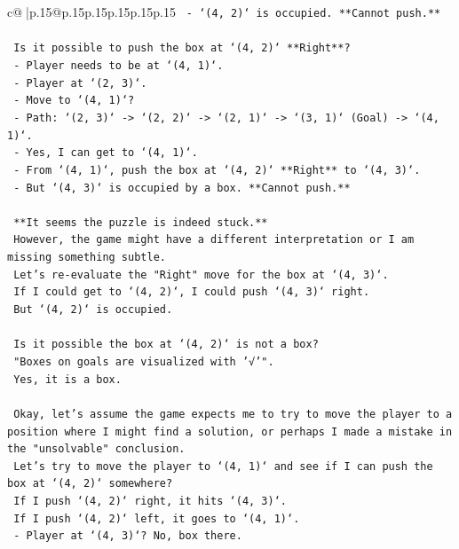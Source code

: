 \documentclass{article}
\begin{document}
{\begin{supertabular}{c@{$\;$}|p{.15\linewidth}@{}p{.15\linewidth}p{.15\linewidth}p{.15\linewidth}p{.15\linewidth}p{.15\linewidth}}
{{{\texttt{    {-} `(4, 2)` is occupied. **Cannot push.**} \\
\\ 
\texttt{    Is it possible to push the box at `(4, 2)` **Right**?} \\
\texttt{    {-} Player needs to be at `(4, 1)`.} \\
\texttt{    {-} Player at `(2, 3)`.} \\
\texttt{    {-} Move to `(4, 1)`?} \\
\texttt{    {-} Path: `(2, 3)` {-}> `(2, 2)` {-}> `(2, 1)` {-}> `(3, 1)` (Goal) {-}> `(4, 1)`.} \\
\texttt{    {-} Yes, I can get to `(4, 1)`.} \\
\texttt{    {-} From `(4, 1)`, push the box at `(4, 2)` **Right** to `(4, 3)`.} \\
\texttt{    {-} But `(4, 3)` is occupied by a box. **Cannot push.**} \\
\\ 
\texttt{    **It seems the puzzle is indeed stuck.**} \\
\texttt{    However, the game might have a different interpretation or I am missing something subtle.} \\
\texttt{    Let's re{-}evaluate the "Right" move for the box at `(4, 3)`.} \\
\texttt{    If I could get to `(4, 2)`, I could push `(4, 3)` right.} \\
\texttt{    But `(4, 2)` is occupied.} \\
\\ 
\texttt{    Is it possible the box at `(4, 2)` is not a box?} \\
\texttt{    "Boxes on goals are visualized with '√'".} \\
\texttt{    Yes, it is a box.} \\
\\ 
\texttt{    Okay, let's assume the game expects me to try to move the player to a position where I might find a solution, or perhaps I made a mistake in the "unsolvable" conclusion.} \\
\texttt{    Let's try to move the player to `(4, 1)` and see if I can push the box at `(4, 2)` somewhere?} \\
\texttt{    If I push `(4, 2)` right, it hits `(4, 3)`.} \\
\texttt{    If I push `(4, 2)` left, it goes to `(4, 1)`.} \\
\texttt{    {-} Player at `(4, 3)`? No, box there.} \\
}}}
\end{supertabular}}
\end{document}

